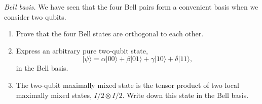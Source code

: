 \begin{exercise}
\emph{Bell basis.} We have seen that the four Bell pairs form a convenient basis when we consider two qubits.
\begin{enumerate}[label=(\alph*)]
    \item Prove that the four Bell states are orthogonal to each other.
    \item Express an arbitrary pure two-qubit state,
    \begin{equation*}
    |\psi\rangle = \alpha |00\rangle + \beta|01\rangle + \gamma|10\rangle + \delta|11\rangle,
    \end{equation*}
    in the Bell basis.
    \item The two-qubit maximally mixed state is the tensor product of two local maximally mixed states, $I/2 \otimes I/2$. Write down this state in the Bell basis.
\end{enumerate}
\end{exercise}
